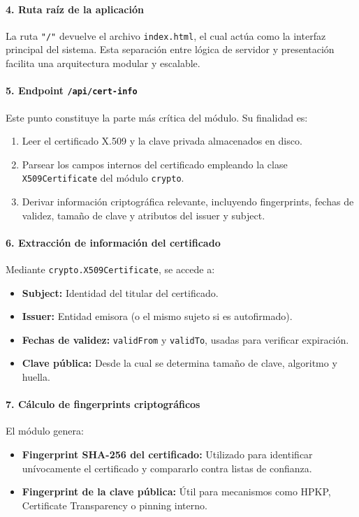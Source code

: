 \paragraph{4. Ruta raíz de la aplicación}
La ruta \texttt{"/"} devuelve el archivo \texttt{index.html}, el cual actúa como la interfaz principal del sistema. Esta separación entre lógica de servidor y presentación facilita una arquitectura modular y escalable.

\paragraph{5. Endpoint \texttt{/api/cert-info}}
Este punto constituye la parte más crítica del módulo. Su finalidad es:
\begin{enumerate}
  \item Leer el certificado X.509 y la clave privada almacenados en disco.
  \item Parsear los campos internos del certificado empleando la clase \texttt{X509Certificate} del módulo \texttt{crypto}.
  \item Derivar información criptográfica relevante, incluyendo fingerprints, fechas de validez, tamaño de clave y atributos del issuer y subject.
\end{enumerate}

\paragraph{6. Extracción de información del certificado}
Mediante \texttt{crypto.X509Certificate}, se accede a:
\begin{itemize}
  \item \textbf{Subject:} Identidad del titular del certificado.
  \item \textbf{Issuer:} Entidad emisora (o el mismo sujeto si es autofirmado).
  \item \textbf{Fechas de validez:} \texttt{validFrom} y \texttt{validTo}, usadas para verificar expiración.
  \item \textbf{Clave pública:} Desde la cual se determina tamaño de clave, algoritmo y huella.
\end{itemize}

\paragraph{7. Cálculo de fingerprints criptográficos}
El módulo genera:
\begin{itemize}
  \item \textbf{Fingerprint SHA-256 del certificado:} Utilizado para identificar unívocamente el certificado y compararlo contra listas de confianza.
  \item \textbf{Fingerprint de la clave pública:} Útil para mecanismos como HPKP, Certificate Transparency o pinning interno.
\end{itemize}

